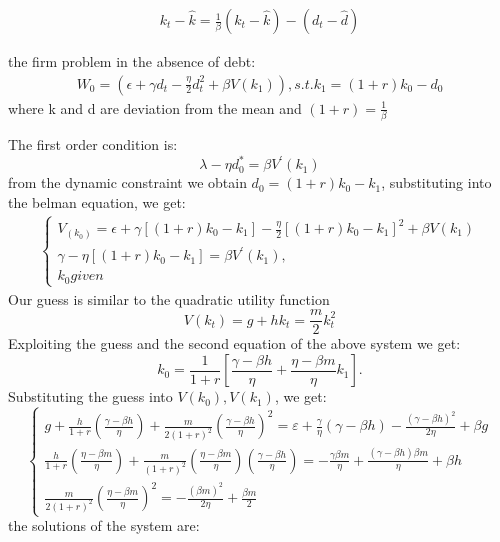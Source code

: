 \documentclass[12pt]{report}
\begin{document}
\begin{align*}
    k_t-\hat{k}=\frac{1}{\beta}(k_t-\hat{k})-(d_t-\hat{d})
\end{align*}

the firm problem in the absence of debt:
\begin{align*}
    W_0= \left(\epsilon + \gamma d_t - \frac{\eta}{2}d_t^2 + \beta V(k_1)\right),
    s.t. k_1 = (1+r)k_0-d_0
\end{align*}
where k and d are deviation from the mean and \(\left(1+r\right)=\frac{1}{\beta}\)

The first order condition is: 
\begin{equation}
    \lambda - \eta d_0^* = \beta V^{\prime}(k_1)
\end{equation}
from the dynamic constraint we obtain \(d_0=(1+r)k_0-k_1\), substituting into the belman equation, we get:
\begin{align*}
    \begin{cases}
        V_(k_0)= \epsilon + \gamma [(1+r)k_0 -k_1] - \frac{\eta}{2}\left[\left(1+r\right)k_0 -k_1\right]^2 +\beta V(k_1)\\
        \gamma -\eta\left[\left(1+r\right)k_0-k_1\right]=\beta V^{\prime}(k_1), \\ 
        k_0 given
    \end{cases}
\end{align*}
Our guess is similar to the quadratic utility function 
\begin{equation}
    V(k_t)=g+h k_t = \frac{m}{2}k_t^2
\end{equation}
Exploiting the guess and the second equation of the above system we get:
\begin{equation}
    k_0=\frac{1}{1+r}\left[\frac{\gamma-\beta h}{\eta}+\frac{\eta-\beta m}{\eta} k_1\right] .
\end{equation}
Substituting the guess into \(V(k_0), V(k_1)\), we get:
\begin{equation}
    \left\{\begin{array}{c}
    g+\frac{h}{1+r}\left(\frac{\gamma-\beta h}{\eta}\right)+\frac{m}{2(1+r)^2}\left(\frac{\gamma-\beta h}{\eta}\right)^2=\varepsilon+\frac{\gamma}{\eta}(\gamma-\beta h)-\frac{(\gamma-\beta h)^2}{2 \eta}+\beta g \\
    \frac{h}{1+r}\left(\frac{\eta-\beta m}{\eta}\right)+\frac{m}{(1+r)^2}\left(\frac{\eta-\beta m}{\eta}\right)\left(\frac{\gamma-\beta h}{\eta}\right)=-\frac{\gamma \beta m}{\eta}+\frac{(\gamma-\beta h) \beta m}{\eta}+\beta h \\
    \frac{m}{2(1+r)^2}\left(\frac{\eta-\beta m}{\eta}\right)^2=-\frac{(\beta m)^2}{2 \eta}+\frac{\beta m}{2}
    \end{array}\right.
\end{equation}
the solutions of the system are:
\end{document}
